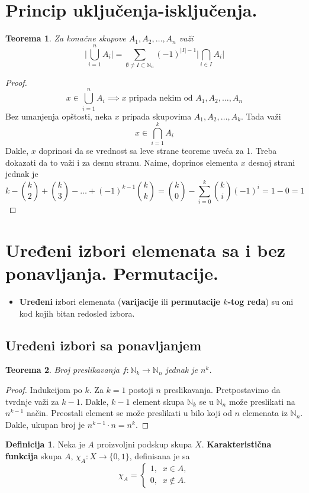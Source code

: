 \documentclass[a4paper,12pt]{article}
\numberwithin{algorithm}{section}
\theoremstyle{plain}
\newtheorem{theorem}{Teorema}[section]
\theoremstyle{definition}
\newtheorem{definition}{Definicija}[section]
\theoremstyle{remark}
\begin{document}
\section{Princip uključenja-isključenja.}

\begin{theorem}
    Za konačne skupove $A_1, A_2, \ldots, A_n$ važi
    \[ \Bigg| \bigcup_{i = 1}^n A_i \Bigg| = \sum_{\emptyset \neq I \subset \mathbb{N}_n} (-1)^{|I| - 1} \Bigg| \bigcap_{i \in I} A_i \Bigg|\]
\end{theorem}

\begin{proof}
    \[x \in \bigcup_{i = 1}^n A_i \implies x \;\text{pripada nekim od } A_1, A_2, \ldots, A_n\]
Bez umanjenja opštosti, neka $x$ pripada skupovima $A_1, A_2, \ldots, A_k$. Tada važi
\[ x \in \bigcap_{i = 1}^k A_i \]
Dakle, $x$ doprinosi da se vrednost sa leve strane teoreme uveća za 1. Treba dokazati da to važi i za desnu stranu. Naime, doprinos elementa $x$ desnoj strani jednak je
\[ k - {{k} \choose 2} + {{k} \choose 3} - \ldots + (-1)^{k-1}{{k} \choose k} = {{k} \choose 0} - \sum_{i = 0}^{k}{{k} \choose i}(-1)^i = 1 - 0 = 1 \]
\end{proof}

\section{Uređeni izbori elemenata sa i bez ponavljanja. Permutacije. }
\begin{itemize}
    \item \textbf{Uređeni} izbori elemenata (\textbf{varijacije} ili \textbf{permutacije $k$-tog reda}) su oni kod kojih bitan redosled izbora.
\end{itemize}
\subsection{Uređeni izbori sa ponavljanjem}
\begin{theorem}
    Broj preslikavanja $f: \mathbb{N}_k \rightarrow \mathbb{N}_n$ jednak je $n^k$.
\end{theorem}
\begin{proof}
    Indukcijom po $k$. Za $k = 1$ postoji $n$ preslikavanja. Pretpostavimo da tvrdnje važi za $k-1$.
    Dakle, $k - 1$ element skupa $\mathbb{N}_k$ se u $\mathbb{N}_n$ može preslikati na $n^{k - 1}$ način. Preostali element se može preslikati u bilo koji od $n$ elemenata iz $\mathbb{N}_n$. Dakle, ukupan broj je $n^{k - 1} \cdot n = n^k$.
\end{proof}
\begin{definition}
    Neka je $A$ proizvoljni podskup skupa $X$. \textbf{Karakteristična funkcija} skupa $A$, $\chi_A : X \rightarrow \{0, 1\}$, definisana je sa
    \[ \chi_A = \begin{cases}
        1,\;\; x \in A, \\
        0,\;\; x \not\in A.
    \end{cases} \]
\end{definition}
\end{document}

